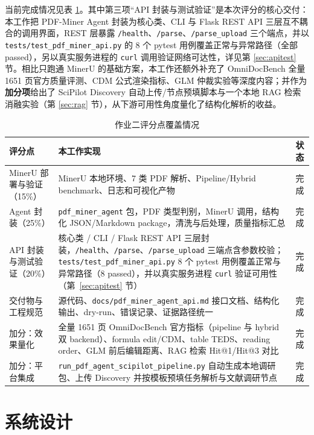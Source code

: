 \documentclass[UTF8,a4paper,11pt]{ctexart}
\begin{document}
当前完成情况见表 \ref{tab:coverage}。其中第三项``API 封装与测试验证''是本次评分的核心交付：本工作把 PDF-Miner Agent 封装为核心类、CLI 与 Flask REST API 三层互不耦合的调用界面，REST 层暴露 \texttt{/health}、\texttt{/parse}、\texttt{/parse\_upload} 三个端点，并以 \texttt{tests/test\_pdf\_miner\_api.py} 的 8 个 pytest 用例覆盖正常与异常路径（全部 passed），另以真实服务进程的 \texttt{curl} 调用验证网络可达性，详见第 \ref{sec:apitest} 节。相比只跑通 MinerU 的基础方案，本工作还额外补充了 OmniDocBench 全量 1651 页官方质量评测、CDM 公式渲染指标、GLM 仲裁实验等深度内容；并作为\textbf{加分项}给出了 SciPilot Discovery 自动上传/节点预填脚本与一个本地 RAG 检索消融实验（第 \ref{sec:rag} 节），从下游可用性角度量化了结构化解析的收益。

\begin{table}[H]
\centering
\caption{作业二评分点覆盖情况}
\label{tab:coverage}
\begin{tabular}{p{3.2cm}p{8.8cm}p{2.2cm}}
\toprule
评分点 & 本工作实现 & 状态 \\
\midrule
MinerU 部署与验证（15\%） & MinerU 本地环境、7 类 PDF 解析、Pipeline/Hybrid benchmark、日志和可视化产物 & 完成 \\
Agent 封装（25\%） & \texttt{pdf\_miner\_agent} 包，PDF 类型判别，MinerU 调用，结构化 JSON/Markdown package，清洗与后处理，质量指标汇总 & 完成 \\
API 封装与测试验证（20\%） & 核心类 / CLI / Flask REST API 三层封装，\texttt{/health}、\texttt{/parse}、\texttt{/parse\_upload} 三端点含参数校验；\texttt{tests/test\_pdf\_miner\_api.py} 8 个 pytest 用例覆盖正常与异常路径（8 passed），并以真实服务进程 \texttt{curl} 验证可用性（第~\ref{sec:apitest} 节）& 完成 \\
交付物与工程规范 & 源代码、\texttt{docs/pdf\_miner\_agent\_api.md} 接口文档、结构化输出、dry-run、错误记录、证据路径统一 & 完成 \\
加分：效果量化 & 全量 1651 页 OmniDocBench 官方指标（pipeline 与 hybrid 双 backend）、formula edit/CDM、table TEDS、reading order、GLM 前后编辑距离、RAG 检索 Hit@1/Hit@3 对比 & 完成 \\
加分：平台集成 & \texttt{run\_pdf\_agent\_scipilot\_pipeline.py} 自动生成本地调研包、上传 Discovery 并按模板预填任务解析与文献调研节点 & 完成 \\
\bottomrule
\end{tabular}
\end{table}

\section{系统设计}
\label{sec:design}
\end{document}

